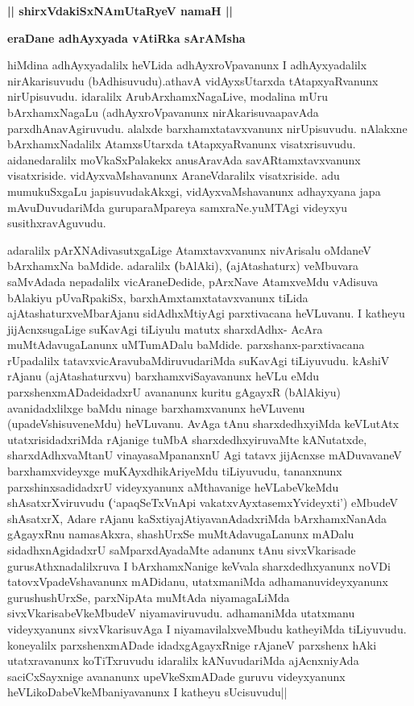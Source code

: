 \begin{center}
{\large\bf || shirxVdakiSxNAmUtaRyeV namaH ||}
\bigskip

{\Large\bf eraDane adhAyxyada vAtiRka sArAMsha}
\end{center}

\centerline{}

\begin{artha}
hiMdina adhAyxyadalilx heVLida adhAyxroVpavanunx I adhAyxyadalilx nirAkarisuvudu (bAdhisuvudu).athavA vidAyxsUtarxda tAtapxyaRvanunx nirUpisuvudu. idaralilx ArubArxhamxNagaLive, modalina mUru bArxhamxNagaLu (adhAyxroVpavanunx nirAkarisuvaapavAda parxdhAnavAgiruvudu. alalxde barxhamxtatavxvanunx nirUpisuvudu. nAlakxne bArxhamxNadalilx AtamxsUtarxda tAtapxyaRvanunx visatxrisuvudu. aidanedaralilx moVkaSxPalakekx anusAravAda savARtamxtavxvanunx visatxriside. vidAyxvaMshavanunx AraneVdaralilx visatxriside. adu mumukuSxgaLu japisuvudakAkxgi, vidAyxvaMshavanunx adhayxyana japa mAvuDuvudariMda guruparaMpareya samxraNe.yuMTAgi videyxyu susithxravAguvudu.
\end{artha}

\centerline{}

\begin{artha}
adaralilx pArXNAdivasutxgaLige Atamxtavxvanunx nivArisalu oMdaneV bArxhamxNa 	 baMdide. adaralilx \textbf(bAlAki), \textbf(ajAtashaturx) veMbuvara saMvAdada nepadalilx vicAraneDedide, pArxNave AtamxveMdu vAdisuva bAlakiyu pUvaRpakiSx, barxhAmxtamxtatavxvanunx tiLida ajAtashaturxveMbarAjanu sidAdhxMtiyAgi parxtivacana heVLuvanu. I katheyu jijAcnxsugaLige suKavAgi tiLiyulu matutx sharxdAdhx- AcAra muMtAdavugaLanunx uMTumADalu baMdide. parxshanx-parxtivacana rUpadalilx tatavxvicAravubaMdiruvudariMda suKavAgi tiLiyuvudu. kAshiV rAjanu (ajAtashaturxvu) barxhamxviSayavanunx heVLu eMdu parxshenxmADadeidadxrU avananunx kuritu gAgayxR (bAlAkiyu) avanidadxlilxge baMdu ninage barxhamxvanunx heVLuvenu (upadeVshisuveneMdu) heVLuvanu. AvAga tAnu sharxdedhxyiMda keVLutAtx utatxrisidadxriMda rAjanige tuMbA sharxdedhxyiruvaMte kANutatxde, sharxdAdhxvaMtanU vinayasaMpananxnU Agi tatavx jijAcnxse mADuvavaneV barxhamxvideyxge muKAyxdhikAriyeMdu tiLiyuvudu, tananxnunx parxshinxsadidadxrU videyxyanunx aMthavanige heVLabeVkeMdu shAsatxrXviruvudu \textbf(`apaqSeTxVnApi vakatxvAyxtasemxYvideyxti') eMbudeV shAsatxrX, Adare rAjanu kaSxtiyajAtiyavanAdadxriMda bArxhamxNanAda gAgayxRnu namasAkxra, shashUrxSe muMtAdavugaLanunx mADalu sidadhxnAgidadxrU saMparxdAyadaMte adanunx tAnu sivxVkarisade gurusAthxnadalilxruva I bArxhamxNanige keVvala sharxdedhxyanunx noVDi tatovxVpadeVshavanunx mADidanu, utatxmaniMda adhamanuvideyxyanunx gurushushUrxSe, parxNipAta muMtAda niyamagaLiMda sivxVkarisabeVkeMbudeV niyamaviruvudu. adhamaniMda utatxmanu videyxyanunx sivxVkarisuvAga I niyamavilalxveMbudu katheyiMda tiLiyuvudu. koneyalilx parxshenxmADade idadxgAgayxRnige rAjaneV parxshenx hAki utatxravanunx koTiTxruvudu idaralilx kANuvudariMda ajAcnxniyAda saciCxSayxnige avananunx upeVkeSxmADade guruvu videyxyanunx heVLikoDabeVkeMbaniyavanunx I katheyu sUcisuvudu||
\end{artha}

